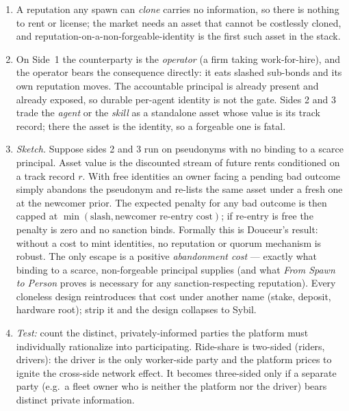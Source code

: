 \begin{enumerate}[label=\textbf{IV.\arabic*},leftmargin=2.8em,itemsep=8pt,topsep=4pt]

\item \wbcheck A reputation any spawn can \emph{clone} carries no information, so
  there is nothing to rent or license; the market needs an asset that cannot be
  costlessly cloned, and reputation-on-a-non-forgeable-identity is the first such
  asset in the stack.

\item \wbcheck On Side~1 the counterparty is the \emph{operator} (a firm taking
  work-for-hire), and the operator bears the consequence directly: it eats slashed
  sub-bonds and its own reputation moves. The accountable principal is already
  present and already exposed, so durable per-agent identity is not the gate.
  Sides 2 and 3 trade the \emph{agent} or the \emph{skill} as a standalone asset
  whose value is its track record; there the asset is the identity, so a forgeable
  one is fatal.

\item \wbopen\wbstar \emph{Sketch.} Suppose sides 2 and 3 run on pseudonyms with no
  binding to a scarce principal. Asset value is the discounted stream of future
  rents conditioned on a track record $r$. With free identities an owner facing a
  pending bad outcome simply abandons the pseudonym and re-lists the same asset under
  a fresh one at the newcomer prior. The expected penalty for any bad outcome is then
  capped at $\min(\text{slash}, \text{newcomer re-entry cost})$; if re-entry is free
  the penalty is zero and no sanction binds. Formally this is Douceur's result:
  without a cost to mint identities, no reputation or quorum mechanism is robust. The
  only escape is a positive \emph{abandonment cost} --- exactly what binding to a
  scarce, non-forgeable principal supplies (and what \emph{From Spawn to Person}
  proves is necessary for any sanction-respecting reputation). Every cloneless design
  reintroduces that cost under another name (stake, deposit, hardware root); strip it
  and the design collapses to Sybil.

\item \wbcheck \emph{Test:} count the distinct, privately-informed parties the
  platform must individually rationalize into participating. Ride-share is two-sided
  (riders, drivers): the driver is the only worker-side party and the platform
  prices to ignite the cross-side network effect. It becomes three-sided only if a
  separate party (e.g.\ a fleet owner who is neither the platform nor the driver)
  bears distinct private information.


\end{enumerate}
